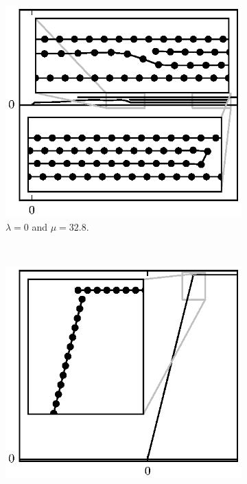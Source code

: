 {   \begin{figure}[t]
      \centering
      \begin{subfigure}{.5\textwidth}
         \centering
         \includegraphics{./fig/ch3/pull/eb0.1/l0_m32.8.eps}
         \caption{$\lambda=0$ and $\mu=32.8$. \label{subfig:folded_over}}
      \end{subfigure}%
      ~
      \begin{subfigure}{.5\textwidth}
         \centering
         \includegraphics{./fig/ch3/pull/eb0/t76_m4.eps}

\end{subfigure}
\end{figure}}
